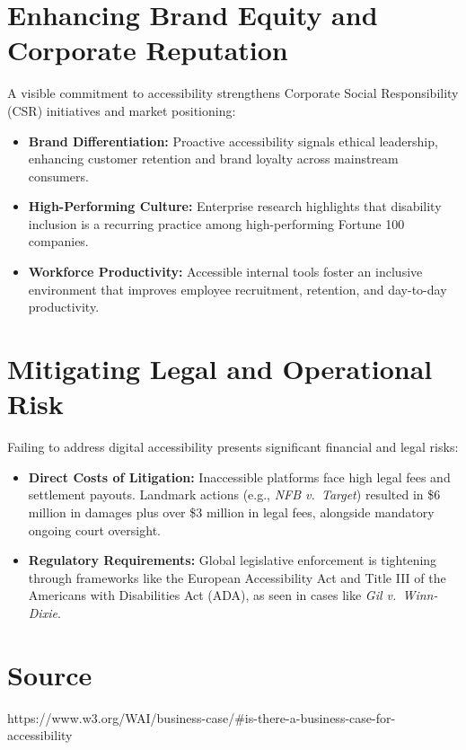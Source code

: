\documentclass[11pt,a4paper]{article}
\begin{document}
\section{Enhancing Brand Equity and Corporate Reputation}
A visible commitment to accessibility strengthens Corporate Social
Responsibility (CSR) initiatives and market positioning:
\begin{itemize}
  \item \textbf{Brand Differentiation:} Proactive accessibility signals
        ethical leadership, enhancing customer retention and brand loyalty
        across mainstream consumers.
  \item \textbf{High-Performing Culture:} Enterprise research highlights that
        disability inclusion is a recurring practice among high-performing
        Fortune 100 companies.
  \item \textbf{Workforce Productivity:} Accessible internal tools foster an
        inclusive environment that improves employee recruitment, retention,
        and day-to-day productivity.
\end{itemize}

\section{Mitigating Legal and Operational Risk}
Failing to address digital accessibility presents significant financial and
legal risks:
\begin{itemize}
  \item \textbf{Direct Costs of Litigation:} Inaccessible platforms face high
        legal fees and settlement payouts. Landmark actions (e.g., \emph{NFB
        v.\ Target}) resulted in \$6 million in damages plus over \$3 million
        in legal fees, alongside mandatory ongoing court oversight.
  \item \textbf{Regulatory Requirements:} Global legislative enforcement is
        tightening through frameworks like the European Accessibility Act and
        Title III of the Americans with Disabilities Act (ADA), as seen in
        cases like \emph{Gil v.\ Winn-Dixie}.
\end{itemize}

\section{Source} 
https://www.w3.org/WAI/business-case/\#is-there-a-business-case-for-accessibility
\end{document}
